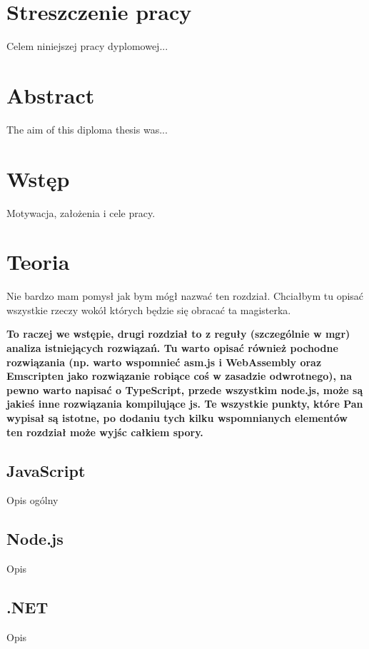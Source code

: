 \documentclass[a4paper]{article}
\begin{document}
\section*{Streszczenie pracy}
%
Celem niniejszej pracy dyplomowej...

\hspace{0pt}
\vfill

\section*{Abstract}
%
The aim of this diploma thesis was...
\vfill
\hspace{0pt}

\newpage
\tableofcontents
\newpage

\section{Wstęp}
Motywacja, założenia i cele pracy.

\section{Teoria}
\par
Nie bardzo mam pomysł jak bym mógł nazwać ten rozdział. Chciałbym tu opisać wszystkie rzeczy wokół których będzie się obracać ta magisterka.

\textbf{To raczej we wstępie, drugi rozdział to z reguły (szczególnie w mgr) analiza istniejących rozwiązań. Tu warto opisać również pochodne rozwiązania (np. warto wspomnieć asm.js i WebAssembly oraz Emscripten jako rozwiązanie robiące coś w zasadzie odwrotnego), na pewno warto napisać o TypeScript, przede wszystkim node.js, może są jakieś inne rozwiązania kompilujące js.
Te wszystkie punkty, które Pan wypisał są istotne, po dodaniu tych kilku wspomnianych elementów ten rozdział może wyjśc całkiem spory.}

\subsection{JavaScript}
Opis ogólny
\subsection{Node.js}
Opis
\subsection{.NET}
Opis
\end{document}
